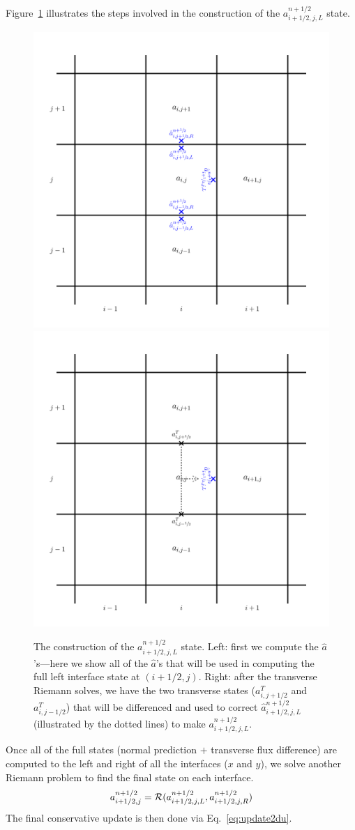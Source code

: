 Figure~\ref{fig:unsplitstates} illustrates the steps involved in
the construction of the $a_{i+1/2,j,L}^{n+1/2}$ state.
%
\begin{figure}
\centering
\includegraphics[width=0.495\linewidth]{2dgrid-hat}
\includegraphics[width=0.495\linewidth]{2dgrid-transverse}
\caption[The construction of an interface state with the transverse
  component.]{\label{fig:unsplitstates} The construction of the
  $a_{i+1/2,j,L}^{n+1/2}$ state.  Left: first we compute the
  $\hat{a}$'s---here we show all of the $\hat{a}$'s that will be used
  in computing the full left interface state at $(i+1/2,j)$.  Right:
  after the transverse Riemann solves, we have the two transverse
  states ($a^T_{i,j+1/2}$ and $a^T_{i,j-1/2}$) that will be
  differenced and used to correct $\hat{a}_{i+1/2,j,L}^{n+1/2}$
  (illustrated by the dotted lines) to make $a_{i+1/2,j,L}^{n+1/2}$.}
\end{figure}

Once all of the full states (normal prediction $+$ transverse flux
difference) are computed to the left and right of all the interfaces
($x$ and $y$), we solve another Riemann problem to find the final 
state on each interface.
\begin{equation}
a_{i+1/2,j}^{n+1/2} = \mathcal{R}(a_{i+1/2,j,L}^{n+1/2},
                                  a_{i+1/2,j,R}^{n+1/2}) \\
\end{equation}
The final conservative update is then done via Eq.~\ref{eq:update2du}.

